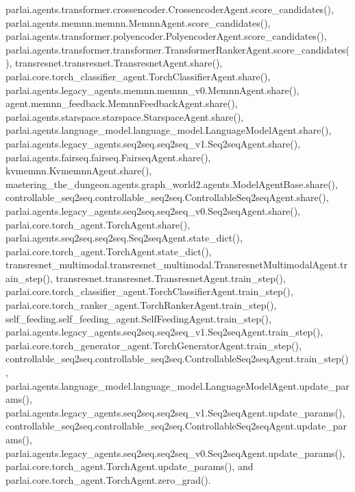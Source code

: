 parlai.\+agents.\+transformer.\+crossencoder.\+Crossencoder\+Agent.\+score\+\_\+candidates(), parlai.\+agents.\+memnn.\+memnn.\+Memnn\+Agent.\+score\+\_\+candidates(), parlai.\+agents.\+transformer.\+polyencoder.\+Polyencoder\+Agent.\+score\+\_\+candidates(), parlai.\+agents.\+transformer.\+transformer.\+Transformer\+Ranker\+Agent.\+score\+\_\+candidates(), transresnet.\+transresnet.\+Transresnet\+Agent.\+share(), parlai.\+core.\+torch\+\_\+classifier\+\_\+agent.\+Torch\+Classifier\+Agent.\+share(), parlai.\+agents.\+legacy\+\_\+agents.\+memnn.\+memnn\+\_\+v0.\+Memnn\+Agent.\+share(), agent.\+memnn\+\_\+feedback.\+Memnn\+Feedback\+Agent.\+share(), parlai.\+agents.\+starspace.\+starspace.\+Starspace\+Agent.\+share(), parlai.\+agents.\+language\+\_\+model.\+language\+\_\+model.\+Language\+Model\+Agent.\+share(), parlai.\+agents.\+legacy\+\_\+agents.\+seq2seq.\+seq2seq\+\_\+v1.\+Seq2seq\+Agent.\+share(), parlai.\+agents.\+fairseq.\+fairseq.\+Fairseq\+Agent.\+share(), kvmemnn.\+Kvmemnn\+Agent.\+share(), mastering\+\_\+the\+\_\+dungeon.\+agents.\+graph\+\_\+world2.\+agents.\+Model\+Agent\+Base.\+share(), controllable\+\_\+seq2seq.\+controllable\+\_\+seq2seq.\+Controllable\+Seq2seq\+Agent.\+share(), parlai.\+agents.\+legacy\+\_\+agents.\+seq2seq.\+seq2seq\+\_\+v0.\+Seq2seq\+Agent.\+share(), parlai.\+core.\+torch\+\_\+agent.\+Torch\+Agent.\+share(), parlai.\+agents.\+seq2seq.\+seq2seq.\+Seq2seq\+Agent.\+state\+\_\+dict(), parlai.\+core.\+torch\+\_\+agent.\+Torch\+Agent.\+state\+\_\+dict(), transresnet\+\_\+multimodal.\+transresnet\+\_\+multimodal.\+Transresnet\+Multimodal\+Agent.\+train\+\_\+step(), transresnet.\+transresnet.\+Transresnet\+Agent.\+train\+\_\+step(), parlai.\+core.\+torch\+\_\+classifier\+\_\+agent.\+Torch\+Classifier\+Agent.\+train\+\_\+step(), parlai.\+core.\+torch\+\_\+ranker\+\_\+agent.\+Torch\+Ranker\+Agent.\+train\+\_\+step(), self\+\_\+feeding.\+self\+\_\+feeding\+\_\+agent.\+Self\+Feeding\+Agent.\+train\+\_\+step(), parlai.\+agents.\+legacy\+\_\+agents.\+seq2seq.\+seq2seq\+\_\+v1.\+Seq2seq\+Agent.\+train\+\_\+step(), parlai.\+core.\+torch\+\_\+generator\+\_\+agent.\+Torch\+Generator\+Agent.\+train\+\_\+step(), controllable\+\_\+seq2seq.\+controllable\+\_\+seq2seq.\+Controllable\+Seq2seq\+Agent.\+train\+\_\+step(), parlai.\+agents.\+language\+\_\+model.\+language\+\_\+model.\+Language\+Model\+Agent.\+update\+\_\+params(), parlai.\+agents.\+legacy\+\_\+agents.\+seq2seq.\+seq2seq\+\_\+v1.\+Seq2seq\+Agent.\+update\+\_\+params(), controllable\+\_\+seq2seq.\+controllable\+\_\+seq2seq.\+Controllable\+Seq2seq\+Agent.\+update\+\_\+params(), parlai.\+agents.\+legacy\+\_\+agents.\+seq2seq.\+seq2seq\+\_\+v0.\+Seq2seq\+Agent.\+update\+\_\+params(), parlai.\+core.\+torch\+\_\+agent.\+Torch\+Agent.\+update\+\_\+params(), and parlai.\+core.\+torch\+\_\+agent.\+Torch\+Agent.\+zero\+\_\+grad().


